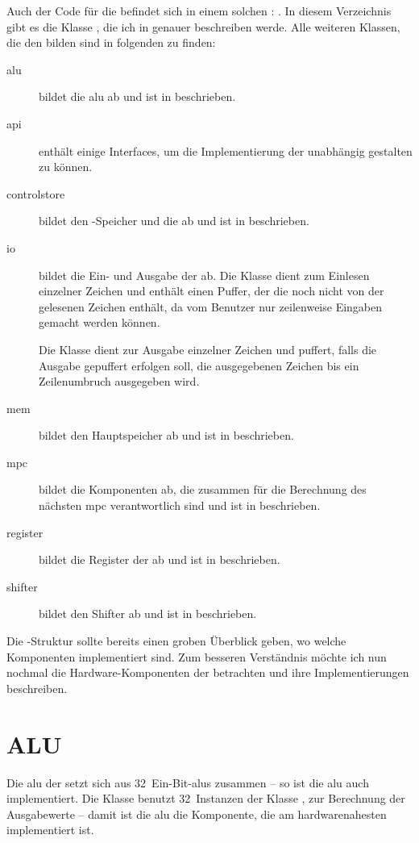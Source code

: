 Auch der Code für die \mic befindet sich in einem solchen \subpackage: . In diesem Verzeichnis gibt es die Klasse , die ich in  genauer beschreiben werde. Alle weiteren Klassen, die den \mic bilden sind in folgenden \subpackages zu finden:
\begin{description}
\item[alu] bildet die \gls{alu} ab und ist in  beschrieben.
\item[api] enthält einige Interfaces, um die Implementierung der \mic unabhängig gestalten zu können.
\item[controlstore] bildet den \mac-Speicher und die \mais ab und ist in  beschrieben.
\item[io] bildet die Ein- und Ausgabe der \mic ab. Die Klasse  dient zum Einlesen einzelner Zeichen und enthält einen Puffer, der die noch nicht von der \mic gelesenen Zeichen enthält, da vom Benutzer nur zeilenweise Eingaben gemacht werden können.

Die Klasse  dient zur Ausgabe einzelner Zeichen und puffert, falls die Ausgabe gepuffert erfolgen soll, die ausgegebenen Zeichen bis ein Zeilenumbruch ausgegeben wird.
\item[mem] bildet den Hauptspeicher ab und ist in  beschrieben.
\item[mpc] bildet die Komponenten ab, die zusammen für die Berechnung des nächsten \gls{mpc} verantwortlich sind und ist in  beschrieben.
\item[register] bildet die Register der \mic ab und ist in  beschrieben.
\item[shifter] bildet den Shifter ab und ist in  beschrieben.
\end{description}

Die \package-Struktur sollte bereits einen groben Überblick geben, wo welche Komponenten implementiert sind. Zum besseren Verständnis möchte ich nun nochmal die Hardware-Komponenten der \mic betrachten und ihre Implementierungen beschreiben.

\section{ALU}
Die \gls{alu} der \mic setzt sich aus 32~Ein-Bit-\gls{alu}s zusammen -- so ist die \gls{alu} auch implementiert. Die Klasse  benutzt 32~Instanzen der Klasse , zur Berechnung der Ausgabewerte -- damit ist die \gls{alu} die Komponente, die am hardwarenahesten implementiert ist.

